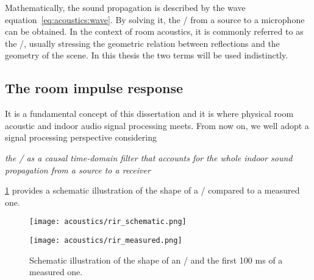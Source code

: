 Mathematically, the sound propagation is described by the wave equation~\eqref{eq:acoustics:wave}.
By solving it, the \AIRdef/
from a source to a microphone can be obtained.
In the context of room acoustics, it is commonly referred to as the \RIRdef/, usually stressing
the geometric relation between reflections and the geometry of the scene.
In this thesis the two terms will be used indistinctly.

\subsection{The room impulse response}\label{ch:acoustics:subsec:rir}
It is a fundamental concept of this dissertation and it is where physical room acoustic and indoor audio signal processing meets.
From now on, we well adopt a signal processing perspective considering
\begin{center}
\textit{the \RIR/ as a causal time-domain filter that accounts for the whole indoor sound propagation
from a source to a receiver}
\end{center}
\cref{fig:acoustics:rir} provides a schematic illustration of the shape of a \RIR/ compared to a measured one.
\begin{figure}[h]
    \centering
    \begin{minipage}[b]{.5\textwidth}
        \centering
        \texttt{[image: acoustics/rir\_schematic.png]}
    \end{minipage}%
    \begin{minipage}[b]{.5\textwidth}
        \centering
        \texttt{[image: acoustics/rir\_measured.png]}
    \end{minipage}
    \caption{Schematic illustration of the shape of an \RIR/ and the first 100 ms of a measured one.}
    \label{fig:acoustics:rir}
\end{figure}

